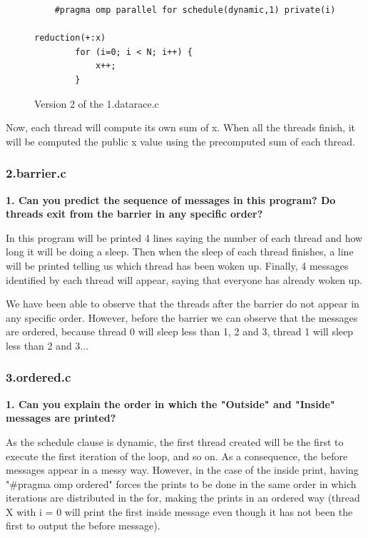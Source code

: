 \documentclass[12pt, a4paper]{article}
\begin{document}
\begin{figure}[H]
	\begin{lstlisting}
	#pragma omp parallel for schedule(dynamic,1) private(i)
											     reduction(+:x)
		for (i=0; i < N; i++) {
			x++;
		}
	\end{lstlisting}
	
	\caption{Version 2 of the 1.datarace.c}
\end{figure}

Now, each thread will compute its own sum of x.
When all the threads finish, it will be computed the public x value using the precomputed sum of each thread.

\subsubsection{2.barrier.c}

\textbf{1. Can you predict the sequence of messages in this program? Do threads exit from the barrier
in any specific order?}

\hfill

In this program will be printed 4 lines saying the number of each thread and how long it will be doing a sleep.
Then when the sleep of each thread finishes, a line will be printed telling us which thread has been woken up.
Finally, 4 messages identified by each thread will appear, saying that everyone has already woken up.

We have been able to observe that the threads after the barrier do not appear in any specific order. However, before the barrier we can observe that the messages are ordered, because thread 0 will sleep less than 1, 2 and 3, thread 1 will sleep less than 2 and 3...

\subsubsection{3.ordered.c}

\textbf{1. Can you explain the order in which the "Outside" and "Inside" messages are printed?}

As the schedule clause is dynamic, the first thread created will be the first to execute the first iteration of the loop, and so on. As a consequence, the before messages appear in a messy way. However, in the case of the inside print, having "\#pragma omp ordered" forces the prints to be done in the same order in which iterations are distributed in the for, making the prints in an ordered way (thread X with i = 0 will print the first inside message even though it has not been the first to output the before message).
\end{document}
